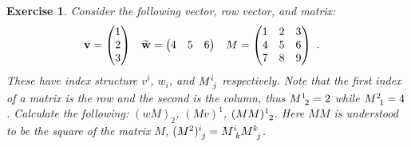 \documentclass[12pt]{article}
\newtheorem{exercise}{Exercise}[section]
\begin{document}
\begin{exercise}
Consider the following vector, row vector, and matrix:
\begin{align}
    \mathbf{v} &=
    \begin{pmatrix}
     1 \\ 2 \\ 3   
    \end{pmatrix}
    &
    \widetilde{\mathbf{w}} &=
    \begin{pmatrix}
        4&5&6
    \end{pmatrix}
    &
    M&=
    \begin{pmatrix}
        1 & 2 & 3 \\
        4 & 5 & 6 \\
        7 & 8 & 9
    \end{pmatrix} \ .
\end{align}
These have index structure $v^i$, $w_i$, and $M\aij{i}{j}$ respectively. Note that the first index of a matrix is the row and the second is the column, thus $M\aij{1}{2} = 2$ while $M\aij{2}{1} = 4$. Calculate the following: $(wM)_2$, $(Mv)^1$, $(MM)\aij{1}{2}$. Here $MM$ is understood to be the square of the matrix $M$, $(M^2)\aij{i}{j} = M\aij{i}{k}M\aij{k}{j}$.
\end{exercise}
\end{document}
